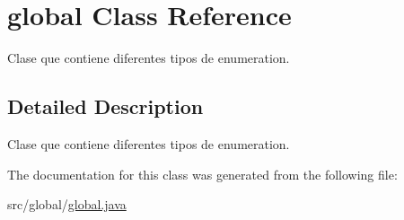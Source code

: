 \hypertarget{classglobal}{}\section{global Class Reference}
\label{classglobal}


Clase que contiene diferentes tipos de enumeration.  




\subsection{Detailed Description}
Clase que contiene diferentes tipos de enumeration. 

The documentation for this class was generated from the following file\+:\begin{DoxyCompactItemize}
\item 
src/global/\hyperlink{global_8java}{global.\+java}\end{DoxyCompactItemize}
